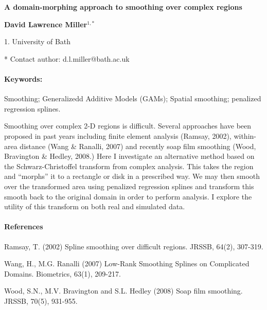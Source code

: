 \documentclass[10pt]{article}
\renewcommand{\title}[1]{\begin{center}{\bf \LARGE #1}\end{center}}
\newcommand{\keywords}{\paragraph{Keywords:}}
\begin{document}
\pagestyle{empty}

\title{A domain-morphing approach to smoothing over complex regions}

\begin{center}
  {\bf David Lawrence Miller$^{1,*}$}
\end{center}

\begin{affiliations}
1. University of Bath\par
* Contact author: d.l.miller@bath.ac.uk
\end{affiliations}

\keywords Smoothing; Generalizedd Additive Models (GAMs); Spatial smoothing; penalized regression splines.

\vskip 0.8cm

Smoothing over complex 2-D regions is difficult. Several approaches have been proposed in past years including finite element analysis (Ramsay, 2002), within-area distance (Wang \& Ranalli, 2007) and recently soap film smoothing (Wood, Bravington \& Hedley, 2008.) Here I investigate an alternative method based on the Schwarz-Christoffel transform from complex analysis. This takes the region and ``morphs'' it to a rectangle or disk in a prescribed way. We may then smooth over the transformed area using penalized regression splines and transform this smooth back to the original domain in order to perform analysis. I explore the utility of this transform on both real and simulated data.

\paragraph{References}
\begin{description}
\item Ramsay, T. (2002) Spline smoothing over difficult regions. JRSSB, 64(2), 307-319.
\item Wang, H., M.G. Ranalli (2007) Low-Rank Smoothing Splines on Complicated Domains. Biometrics, 63(1), 209-217.
\item Wood, S.N., M.V. Bravington and S.L. Hedley (2008) Soap film smoothing. JRSSB, 70(5), 931-955.
\end{description}

%
%
\end{document}
